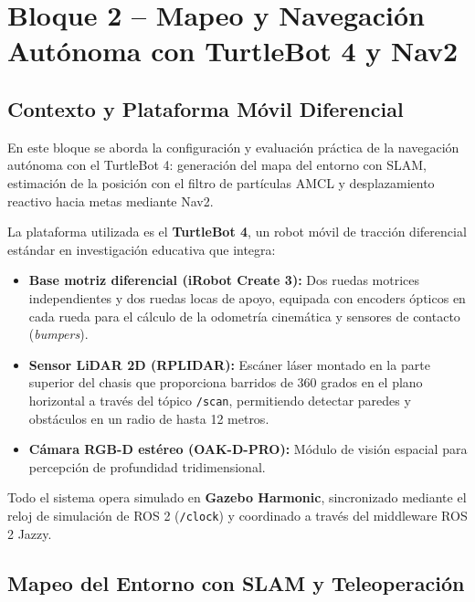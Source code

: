 \documentclass[11pt,a4paper]{article}
\begin{document}
\vspace{1em}

\section{Bloque 2 -- Mapeo y Navegación Autónoma con TurtleBot 4 y Nav2}

\subsection{Contexto y Plataforma Móvil Diferencial}

En este bloque se aborda la configuración y evaluación práctica de la navegación autónoma con el TurtleBot 4: generación del mapa del entorno con SLAM, estimación de la posición con el filtro de partículas AMCL y desplazamiento reactivo hacia metas mediante Nav2.

La plataforma utilizada es el \textbf{TurtleBot 4}, un robot móvil de tracción diferencial estándar en investigación educativa que integra:
\begin{itemize}
    \item \textbf{Base motriz diferencial (iRobot Create 3):} Dos ruedas motrices independientes y dos ruedas locas de apoyo, equipada con encoders ópticos en cada rueda para el cálculo de la odometría cinemática y sensores de contacto (\textit{bumpers}).
    \item \textbf{Sensor LiDAR 2D (RPLIDAR):} Escáner láser montado en la parte superior del chasis que proporciona barridos de 360 grados en el plano horizontal a través del tópico \texttt{/scan}, permitiendo detectar paredes y obstáculos en un radio de hasta 12 metros.
    \item \textbf{Cámara RGB-D estéreo (OAK-D-PRO):} Módulo de visión espacial para percepción de profundidad tridimensional.
\end{itemize}

Todo el sistema opera simulado en \textbf{Gazebo Harmonic}, sincronizado mediante el reloj de simulación de ROS 2 (\texttt{/clock}) y coordinado a través del middleware ROS 2 Jazzy.

\subsection{Mapeo del Entorno con SLAM y Teleoperación}
\end{document}
